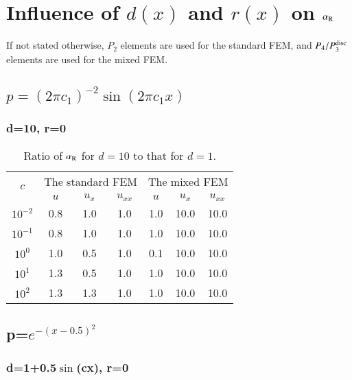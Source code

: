 \documentclass[review,3p]{elsarticle}
\begin{document}
\section{Influence of $d(x)$ and $r(x)$ on \texorpdfstring{$\alpha_{\rm R}$}{alpha_{rm R}}}         \label{discretization_error_bench_pois_diff_Helm}

If not stated otherwise, $P_2$ elements are used for the standard FEM, and $P_4/P_3^{\rm disc}$ elements are used for the mixed FEM.

\subsection{\texorpdfstring{$p=(2\pi c_1)^{-2}\sin(2\pi c_1x)$}{p=(2pic1){-2}sin(2pic1x)}}

\subsubsection{d=10, r=0}


\begin{table}[!ht]
\caption[sss]{Ratio of $\alpha_{\rm R}$ for $d=10$ to that for $d=1$.}
\label{evolution_convergence_order_sample_equations}
\centering
 \begin{tabular}{c c c c c c c} \hline
 \multirow{2}{*}{$c$} & \multicolumn{3}{c}{The standard FEM} & \multicolumn{3}{c}{The mixed FEM} \\ \cline{2-4} \cline{5-7}
 & $u$ & $u_x$ & $u_{xx}$ & $u$ & $u_x$ & $u_{xx}$ \\	\hline
$10^{-2}$ & 0.8 & 1.0 & 1.0 & 1.0 & 10.0 & 10.0 \\ 
$10^{-1}$ & 0.8 & 1.0 & 1.0 & 1.0 & 10.0 & 10.0 \\ 
$10^{0}$ & 1.0 & 0.5 & 1.0 & 0.1 & 10.0 & 10.0 \\ 
$10^{1}$ & 1.3 & 0.5 & 1.0 & 1.0 & 10.0 & 10.0 \\ 
$10^{2}$ & 1.3 & 1.3 & 1.0 & 1.0 & 10.0 & 10.0 \\ \hline
\end{tabular}
\end{table}

\subsection{\texorpdfstring{p=$e^{-(x-0.5)^2}$}{p=e^{-(x-0.5)^2}}}

\subsubsection{d=1+0.5\texorpdfstring{$\sin$(cx)}{sin(cx)}, r=0}            \label{p_exp_d_1plus0p5sin_r_0}
\end{document}
